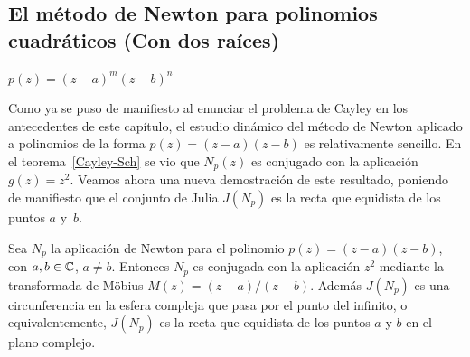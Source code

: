 \subsection{El método de Newton para polinomios cuadráticos (Con dos raíces)}
$p(z)=(z-a)^m (z-b)^n$

Como ya se puso de manifiesto al enunciar el problema de Cayley en los antecedentes de este capítulo, el estudio dinámico del método de Newton aplicado a polinomios de la forma $p(z)=(z-a)(z-b)$ es relativamente sencillo. En el teorema~\ref{Cayley-Sch} se vio que $N_p(z)$ es conjugado con la aplicación $g(z)=z^2$. Veamos ahora una nueva demostración de este resultado, poniendo de manifiesto que el conjunto de Julia $J(N_p)$ es la recta que equidista de los puntos $a$ y~$b$.

\begin{teorema}  
\label{Teorema444}
Sea $N_p$ la aplicación de Newton para el polinomio $p(z)=(z-a) (z-b)$, con $a,b\in \mathbb{C}$, $a\ne b$. Entonces $N_p$ es conjugada con la aplicación $z^2$ mediante la transformada de M\"obius $M(z)=(z-a)/(z-b)$. Además $J(N_p)$ es una circunferencia en la esfera compleja que pasa por el punto del infinito, o equivalentemente, $J(N_p)$ es la recta que equidista de los puntos $a$ y $b$ en el plano complejo.
\end{teorema}

